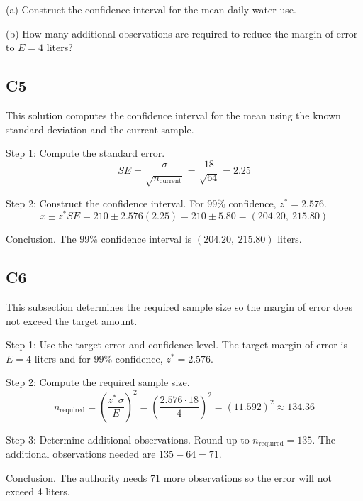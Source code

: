 \begin{ExamProblems}
		(a) Construct the confidence interval for the mean daily water use.
		
		(b) How many additional observations are required to reduce the margin of error to $E = 4$ liters?
		
		\subsection*{C5}
		This solution computes the confidence interval for the mean using the known standard deviation and the current sample.
		
		Step 1: Compute the standard error.
		\[
		SE = \frac{\sigma}{\sqrt{n_{\text{current}}}}
		= \frac{18}{\sqrt{64}}
		= 2.25
		\]
		
		Step 2: Construct the confidence interval. For 99\% confidence, $z^* = 2.576$.
		\[
		\bar{x} \pm z^* SE = 210 \pm 2.576(2.25)
		= 210 \pm 5.80
		= (204.20,\ 215.80)
		\]
		
		Conclusion. The 99\% confidence interval is $(204.20,\ 215.80)$ liters.
		
		\subsection*{C6}
		This subsection determines the required sample size so the margin of error does not exceed the target amount.
		
		Step 1: Use the target error and confidence level. The target margin of error is $E = 4$ liters and for 99\% confidence, $z^* = 2.576$.
		
		Step 2: Compute the required sample size.
		\[
		n_{\text{required}} = \left(\frac{z^*\,\sigma}{E}\right)^2
		= \left(\frac{2.576 \cdot 18}{4}\right)^2
		= \left(11.592\right)^2
		\approx 134.36
		\]
		
		Step 3: Determine additional observations. Round up to $n_{\text{required}} = 135$. The additional observations needed are $135 - 64 = 71$.
		
		Conclusion. The authority needs 71 more observations so the error will not exceed 4 liters.
		
	\end{ExamProblems}


